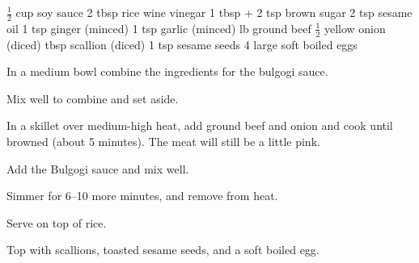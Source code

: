 \dishtype{}
\begin{ingreds}
        $\frac{1}{2}$ cup soy sauce
        2 tbsp rice wine vinegar
        1 tbsp + 2 tsp brown sugar
        2 tsp sesame oil
        1 tsp ginger (minced)
        1 tsp garlic (minced)    
    \columnbreak{}
     lb ground beef
        $\frac{1}{2}$ yellow onion (diced)
    \smallbreak{}
     tbsp scallion (diced)
        1 tsp sesame seeds
        4 large soft boiled eggs
\end{ingreds}
\begin{method}
    In a medium bowl combine the ingredients for the bulgogi sauce.\par
    Mix well to combine and set aside.\par
    In a skillet over medium-high heat, add ground beef and onion and cook until browned (about 5 minutes). The meat will still be a little pink.\par
    Add the Bulgogi sauce and mix well.\par
    Simmer for 6--10 more minutes, and remove from heat.\par
    Serve on top of rice.\par
    Top with scallions, toasted sesame seeds, and a soft boiled egg.
\end{method}
